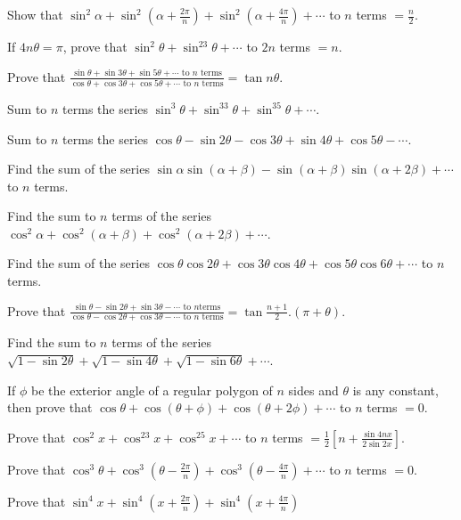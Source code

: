 \item Show that $\sin^2\alpha + \sin^2\left(\alpha + \frac{2\pi}{n}\right) + \sin^2\left(\alpha +
    \frac{4\pi}{n}\right) + \cdots$ to $n$ terms $= \frac{n}{2}$.
\item If $4n\theta = \pi$, prove that $\sin^2\theta + \sin^23\theta + \cdots $ to $2n$ terms $= n$.
\item Prove that $\frac{\sin\theta + \sin3\theta + \sin5\theta + \cdots\text{ to }n\text{ terms}}{\cos\theta
    + \cos3\theta + \cos5\theta + \cdots\text{ to }n\text{ terms}} = \tan n\theta$.
\item Sum to $n$ terms the series $\sin^3\theta + \sin^33\theta + \sin^35\theta + \cdots$.
\item Sum to $n$ terms the series $\cos\theta - \sin2\theta - \cos3\theta + \sin4\theta + \cos5\theta -
  \cdots$.
\item Find the sum of the series $\sin\alpha\sin(\alpha + \beta) - \sin(\alpha + \beta)\sin(\alpha + 2\beta)
  + \cdots$ to $n$ terms.
\item Find the sum to $n$ terms of the series $\cos^2\alpha + \cos^2(\alpha + \beta) + \cos^2(\alpha +
  2\beta) + \cdots$.
\item Find the sum of the series $\cos\theta\cos2\theta + \cos3\theta\cos4\theta + \cos5\theta\cos6\theta +
  \cdots$ to $n$ terms.
\item Prove that $\frac{\sin\theta - \sin2\theta + \sin3\theta - \cdots \text{ to }n\text{
      terms}}{\cos\theta - \cos2\theta + \cos3\theta - \cdots \text{ to }n\text{ terms}} = \tan\frac{n +
    1}{2}.(\pi + \theta)$.
\item Find the sum to $n$ terms of the series $\sqrt{1 - \sin2\theta} + \sqrt{1 - \sin4\theta} + \sqrt{1 -
    \sin6\theta} + \cdots$.
\item If $\phi$ be the exterior angle of a regular polygon of $n$ sides and $\theta$ is any constant, then
  prove that $\cos\theta + \cos(\theta + \phi) + \cos(\theta + 2\phi) + \cdots$ to $n$ terms $ = 0$.
\item Prove that $\cos^2x + \cos^23x + \cos^25x + \cdots$ to $n$ terms $= \frac{1}{2}\left[n +
    \frac{\sin4nx}{2\sin2x}\right]$.
\item Prove that $\cos^3\theta + \cos^3\left(\theta - \frac{2\pi}{n}\right) + \cos^3\left(\theta -
    \frac{4\pi}{n}\right) + \cdots$ to $n$ terms $= 0$.
\item Prove that $\sin^4x + \sin^4\left(x + \frac{2\pi}{n}\right) + \sin^4\left(x + \frac{4\pi}{n}\right)$
